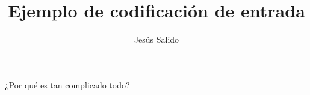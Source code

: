 \documentclass{article}
\title{Ejemplo de codificación de entrada}
\author{Jesús Salido}
\begin{document}
\maketitle
¿Por qué es tan complicado todo?
\end{document}
